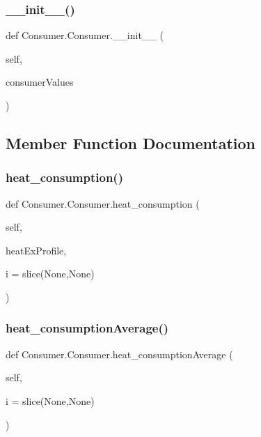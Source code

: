 \subsubsection{\texorpdfstring{\+\_\+\+\_\+init\+\_\+\+\_\+()}{\_\_init\_\_()}}
{\footnotesize\ttfamily def Consumer.\+Consumer.\+\_\+\+\_\+init\+\_\+\+\_\+ (\begin{DoxyParamCaption}\item[{}]{self,  }\item[{}]{consumer\+Values }\end{DoxyParamCaption})}



\subsection{Member Function Documentation}
\mbox{\label{class_consumer_1_1_consumer_a25287e5a16d9185b04c419b8899d3380}} 
\subsubsection{\texorpdfstring{heat\+\_\+consumption()}{heat\_consumption()}}
{\footnotesize\ttfamily def Consumer.\+Consumer.\+heat\+\_\+consumption (\begin{DoxyParamCaption}\item[{}]{self,  }\item[{}]{heat\+Ex\+Profile,  }\item[{}]{i = {\ttfamily slice(None,None)} }\end{DoxyParamCaption})}

\mbox{\label{class_consumer_1_1_consumer_aaedec08d501a0d71638ba308c6b5902e}} 
\subsubsection{\texorpdfstring{heat\+\_\+consumption\+Average()}{heat\_consumptionAverage()}}
{\footnotesize\ttfamily def Consumer.\+Consumer.\+heat\+\_\+consumption\+Average (\begin{DoxyParamCaption}\item[{}]{self,  }\item[{}]{i = {\ttfamily slice(None,None)} }\end{DoxyParamCaption})}

